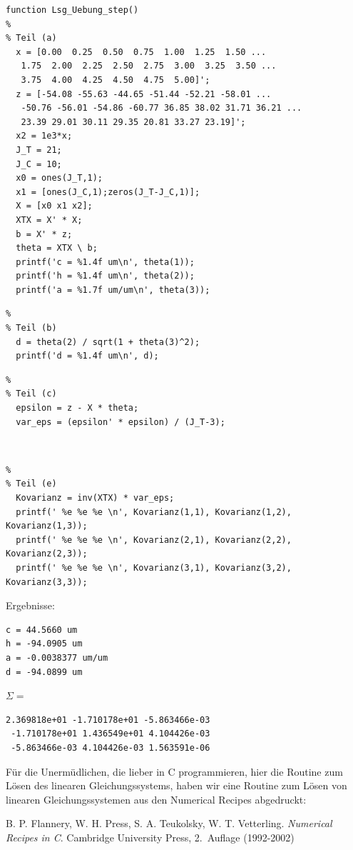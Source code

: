 \begin{verbatim}
function Lsg_Uebung_step()
%
% Teil (a)
  x = [0.00  0.25  0.50  0.75  1.00  1.25  1.50 ...
   1.75  2.00  2.25  2.50  2.75  3.00  3.25  3.50 ...
   3.75  4.00  4.25  4.50  4.75  5.00]';
  z = [-54.08 -55.63 -44.65 -51.44 -52.21 -58.01 ...
   -50.76 -56.01 -54.86 -60.77 36.85 38.02 31.71 36.21 ...
   23.39 29.01 30.11 29.35 20.81 33.27 23.19]';
  x2 = 1e3*x;
  J_T = 21;
  J_C = 10;
  x0 = ones(J_T,1);
  x1 = [ones(J_C,1);zeros(J_T-J_C,1)];
  X = [x0 x1 x2];
  XTX = X' * X;
  b = X' * z;
  theta = XTX \ b;
  printf('c = %1.4f um\n', theta(1));
  printf('h = %1.4f um\n', theta(2));
  printf('a = %1.7f um/um\n', theta(3));
\end{verbatim}
\begin{verbatim}
%
% Teil (b)
  d = theta(2) / sqrt(1 + theta(3)^2);
  printf('d = %1.4f um\n', d);
\end{verbatim}
\begin{verbatim}
%
% Teil (c)
  epsilon = z - X * theta;
  var_eps = (epsilon' * epsilon) / (J_T-3);
\end{verbatim}

~\\

\begin{verbatim}
%
% Teil (e)
  Kovarianz = inv(XTX) * var_eps;
  printf(' %e %e %e \n', Kovarianz(1,1), Kovarianz(1,2), Kovarianz(1,3));
  printf(' %e %e %e \n', Kovarianz(2,1), Kovarianz(2,2), Kovarianz(2,3));
  printf(' %e %e %e \n', Kovarianz(3,1), Kovarianz(3,2), Kovarianz(3,3));
\end{verbatim}

Ergebnisse:
\begin{verbatim}
c = 44.5660 um
h = -94.0905 um
a = -0.0038377 um/um
d = -94.0899 um
\end{verbatim}

$\Sigma =$
\begin{verbatim}
2.369818e+01 -1.710178e+01 -5.863466e-03
 -1.710178e+01 1.436549e+01 4.104426e-03
 -5.863466e-03 4.104426e-03 1.563591e-06
\end{verbatim}

Für die Unermüdlichen, die lieber in C programmieren, hier die Routine zum Lösen
des linearen Gleichungssystems, haben wir eine Routine zum Lösen von linearen
Gleichungssystemen aus den Numerical Recipes abgedruckt:

B. P. Flannery, W. H. Press, S. A. Teukolsky, W. T. Vetterling. \textsl{Numerical Recipes
in C}. Cambridge University Press, 2.~Auflage (1992-2002)

